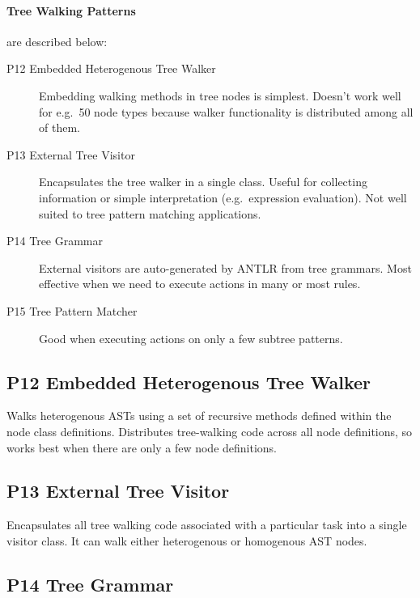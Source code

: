 \paragraph{Tree Walking Patterns} are described below:

\begin{description}
\item[P12 Embedded Heterogenous Tree Walker]
Embedding walking methods in tree nodes is simplest.
Doesn't work well for e.g.\ 50 node types
because walker functionality is distributed among all of them.

\item[P13 External Tree Visitor]
Encapsulates the tree walker in a single class.
Useful for collecting information or simple interpretation
(e.g.\ expression evaluation).
Not well suited to tree pattern matching applications.

\item[P14 Tree Grammar]
External visitors are auto-generated by ANTLR from tree grammars.
Most effective when we need to execute actions in many or most rules.

\item[P15 Tree Pattern Matcher]
Good when executing actions on only a few subtree patterns.
\end{description}


\subsection{P12 Embedded Heterogenous Tree Walker}

Walks heterogenous ASTs using a set of recursive methods
defined within the node class definitions.
Distributes tree-walking code across all node definitions,
so works best when there are only a few node definitions.



\subsection{P13 External Tree Visitor}

Encapsulates all tree walking code associated with a particular task
into a single visitor class.
It can walk either heterogenous or homogenous AST nodes.


\subsection{P14 Tree Grammar}

